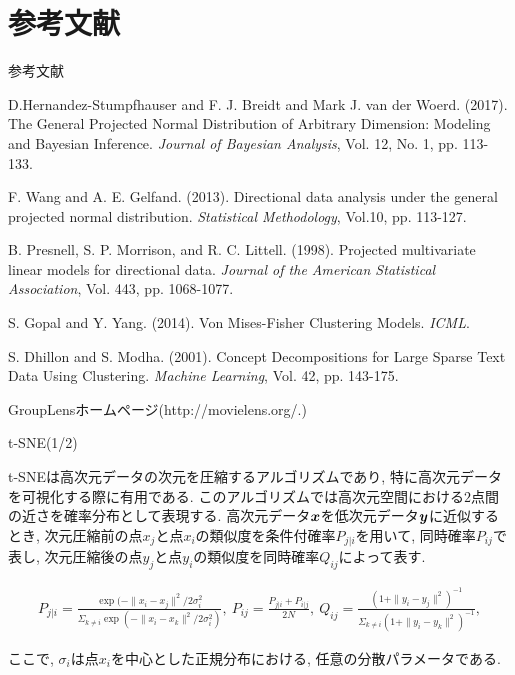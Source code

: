 \documentclass[dvipdfmx]{beamer} %
\newcommand{\backupbegin}{
\newcounter{framenumberappendix}
\setcounter{framenumberappendix}{\value{framenumber}}
}
\newcommand{\bm}[1]{\mbox{\boldmath $#1$}}
\begin{document}
\section{参考文献}
\begin{frame}{参考文献}

{\scriptsize
\begin{thebibliography}{99}
\beamertemplatetextbibitems %

D.Hernandez-Stumpfhauser and F. J. Breidt and Mark J. van der Woerd. (2017). The General Projected Normal Distribution of Arbitrary Dimension: Modeling and Bayesian Inference. {\it Journal of Bayesian Analysis}, Vol. 12, No. 1, pp. 113-133.

F. Wang and A. E. Gelfand. (2013). Directional data analysis under the general
projected normal distribution. {\it Statistical Methodology}, Vol.10, pp. 113-127.

B. Presnell, S. P. Morrison, and R. C. Littell. (1998). Projected multivariate linear models for
directional data. {\it Journal of the American Statistical Association}, Vol. 443, pp. 1068-1077.


S. Gopal and Y. Yang. (2014). Von Mises-Fisher Clustering Models. {\it ICML}.

S. Dhillon and S. Modha. (2001). Concept Decompositions for Large Sparse Text Data Using
Clustering. {\it Machine Learning}, Vol. 42, pp. 143-175.

GroupLensホームページ(http://movielens.org/.) 

\end{thebibliography}
}

\end{frame}

\backupbegin
\begin{frame}{t-SNE(1/2)}

t-SNEは高次元データの次元を圧縮するアルゴリズムであり, 特に高次元データを可視化する際に有用である. このアルゴリズムでは高次元空間における$2$点間の近さを確率分布として表現する. 高次元データ$\bm x$を低次元データ$\bm y$に近似するとき, 次元圧縮前の点$x_j$と点$x_i$の類似度を条件付確率$P_{j|i}$を用いて, 同時確率$P_{ij}$で表し, 次元圧縮後の点$y_j$と点$y_i$の類似度を同時確率$Q_{ij}$によって表す.

\footnotesize
\begin{eqnarray*}
\label{tsne1}
P_{j|i} = \frac{\exp(-\|x_i - x_j\|^2 / 2\sigma_i^2}{\Sigma_{k \neq i}\exp(-\|x_i - x_k\|^2/ 2\sigma_i^2)},\ 
P_{ij} = \frac{P_{j|i} + P_{i|j}}{2N},\ 
Q_{ij} = \frac{(1 + \|y_i - y_j\|^2)^{-1}}{\Sigma_{k \neq i}(1 + \|y_i - y_k\|^2)^{-1}},
\end{eqnarray*}
\normalsize

\noindent
ここで, $\sigma_i$は点$x_i$を中心とした正規分布における, 任意の分散パラメータである.
\end{frame}
\end{document}
